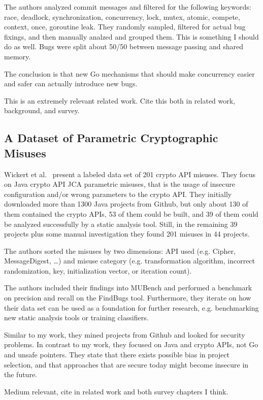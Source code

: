 The authors analyzed commit messages and filtered for the following keywords: race, deadlock, synchronization,
concurrency, lock, mutex, atomic, compete, context, once, goroutine leak.
They randomly sampled, filtered for actual bug fixings, and then manually analzed and grouped them.
This is something I should do as well.
Bugs were split about 50/50 between message passing and shared memory.

The conclusion is that new Go mechanisms that should make concurrency easier and safer can actually introduce new bugs.

This is an extremely relevant related work.
Cite this both in related work, background, and survey.



\subsection{A Dataset of Parametric Cryptographic Misuses}
\label{subsec:a-dataset-of-parametric-cryptographic-misuses}

Wickert et al.~\cite{wickert2019} present a labeled data set of 201 crypto API misuses.
They focus on Java crypto API JCA parametric misuses, that is the usage of insecure configuration and/or wrong
parameters to the crypto API.
They initially downloaded more than 1300 Java projects from Github, but only about 130 of them contained the crypto
APIs, 53 of them could be built, and 39 of them could be analyzed successfully by a static analysis tool.
Still, in the remaining 39 projects plus some manual investigation they found 201 misuses in 44 projects.

The authors sorted the misuses by two dimensions: API used (e.g. Cipher, MessageDigest, \ldots) and misuse category (e.g.
transformation algorithm, incorrect randomization, key, initialization vector, or iteration count).

The authors included their findings into MUBench and performed a benchmark on precision and recall on the FindBugs tool.
Furthermore, they iterate on how their data set can be used as a foundation for further research, e.g. benchmarking new
static analysis tools or training classifiers.

Similar to my work, they mined projects from Github and looked for security problems.
In contrast to my work, they focused on Java and crypto APIs, not Go and unsafe pointers.
They state that there exists possible bias in project selection, and that approaches that are secure today might become
insecure in the future.

Medium relevant, cite in related work and both survey chapters I think.
